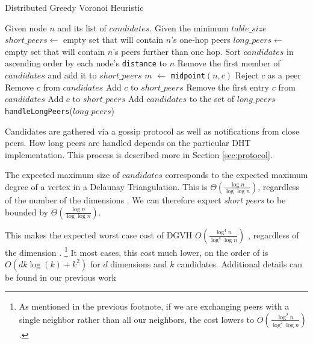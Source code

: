 \documentclass[11pt,conference]{IEEEtran}
\begin{document}
\begin{algorithm} %
	\caption{Distributed Greedy Voronoi Heuristic}
	\label{alg:dgvh}
	\begin{algorithmic}[1]  %
		\STATE Given node $n$ and its list of $candidates$.
		\STATE Given the minimum $table\_size$
		\STATE $short\_peers \leftarrow$ empty set that will contain $n$'s one-hop peers
		\STATE $long\_peers \leftarrow$ empty set that will contain $n$'s peers further than one hop.
		\STATE Sort $candidates$ in ascending order by each node's \texttt{distance} to $n$
		\STATE Remove the first member of $candidates$ and add it to $short\_peers$
			\STATE $m$ $ \leftarrow $ \texttt{midpoint}$( n, c )$
				\STATE Reject $c$ as a peer
			\ELSE
				\STATE Remove $c$ from $candidates$
				\STATE Add $c$ to $short\_peers$
			\ENDIF
		\ENDFOR
			\STATE Remove the first entry $c$ from $candidates$
			\STATE Add $c$ to $short\_peers$
		\ENDWHILE
		\STATE Add $candidates$ to the set of $long\_peers$	
		\STATE \texttt{handleLongPeers}($long\_peers$)
	\end{algorithmic}
\end{algorithm} 


Candidates are gathered via a gossip protocol as well as notifications from close peers.
How long peers are handled depends on the particular DHT implementation.
This process is described more in Section \ref{sec:protocol}.

The expected maximum size of $ candidates $ corresponds to the expected maximum degree of a vertex in a Delaunay Triangulation.
This is  $\Theta(\frac{\log n}{\log \log n} )$, regardless of the number of the dimensions \cite{bern1991expected}. 
We can therefore expect \textit{short peers} to be bounded by $\Theta(\frac{\log n}{\log \log n})$.

This makes the expected worst case cost of DGVH \(O(\frac{\log^{4} n}{\log^{4} \log n} )\) \cite{dgvh}, regardless of the dimension \cite{dgvh}. \footnote{As mentioned in the previous footnote, if we are exchanging peers with a single neighbor rather than all our neighbors, the cost lowers to \(O(\frac{\log^{2} n}{\log^{2} \log n} )\).}
It most cases, this cost much lower, on the order of is $ O(dk\log(k) + k^{2} ) $ for $ d $ dimensions and $ k $ candidates.
Additional details can be found in our previous work \cite{dgvh}
\end{document}
